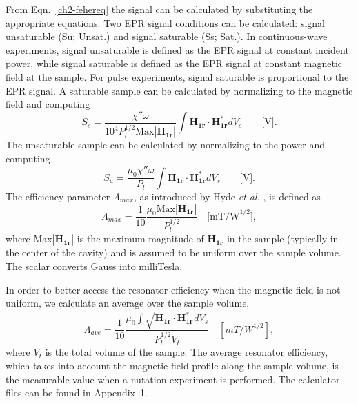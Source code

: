 From Eqn.~\ref{ch2-fehereq} the signal can be calculated by substituting the appropriate equations. Two EPR signal conditions can be calculated: signal unsaturable (Su; Unsat.) and signal saturable (Ss; Sat.). In continuous-wave  experiments, signal unsaturable is defined as the EPR signal at constant incident power, while signal saturable is defined as the EPR signal at constant magnetic field at the sample. For pulse experiments, signal saturable is proportional to the EPR signal. A saturable sample can be calculated by normalizing to the magnetic field and computing
\begin{equation}
    S_s = \frac{\chi'' \omega}{10^4 P_l^{1/2} \text{Max}|\mathbf{H_{1r}}|} \int \mathbf{H_{1r}} \cdot \mathbf{H_{1r}^*} dV_s \qquad \text{[V]}. \label{ch2-eq:ss}
\end{equation}{}
The unsaturable sample can be calculated by normalizing to the power and computing
\begin{equation}
    S_u = \frac{\mu_0 \chi'' \omega}{P_l} \int \mathbf{H_{1r}} \cdot \mathbf{H_{1r}^*} dV_s \qquad  \text{[V]}. \label{ch2-eq:su}
\end{equation}{}
The efficiency parameter $\Lambda_{max}$, as introduced by Hyde {\em et al.} \cite{hydehoff}, is defined as
\begin{equation}
    \Lambda_{max} = \frac{1}{10}\frac{\mu_0 \text{Max}|\mathbf{H_{1r}}|}{P_l^{1/2}} \quad \text{[mT/W}^{1/2}],
\end{equation}
where Max$|\mathbf{H_{1r}}|$ is the maximum magnitude of $\mathbf{H_{1r}}$ in the sample (typically in the center of the cavity) and is assumed to be uniform over the sample volume. \cite{hydehoff} The scalar converts Gauss into milliTesla. 

In order to better access the resonator efficiency when the magnetic field is not uniform, we calculate an average over the sample volume, 
\begin{equation}
    \Lambda_{ave} = \frac{1}{10}\frac{\mu_0 \int \sqrt{\mathbf{H_{1r}} \cdot \mathbf{H_{1r}^*}} dV_s}{P_l^{1/2} V_t} \quad [mT/W^{1/2}], \label{eq:lamave}
\end{equation}
where $V_t$ is the total volume of the sample. The average resonator efficiency, which takes into account the magnetic field profile along the sample volume, is the measurable value when a nutation experiment is performed. The calculator files can be found in Appendix~1.


{\renewcommand{\bibsection}{\clearpage\section*{\bibname}\markboth{\bibname}{\bibname}}
\renewcommand{\bibname}{CHAPTER 2. REFERENCES}


}

